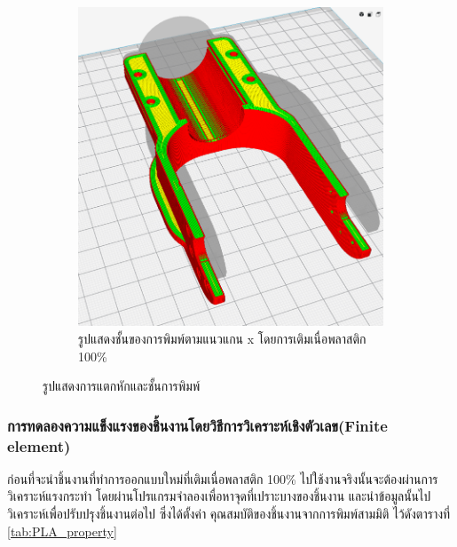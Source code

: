 \begin{figure}[!ht]
\begin{subfigure}[b]{0.38\linewidth}
        \includegraphics[width=\linewidth]{chapter4/images/fatigue3.png}
        \caption{รูปแสดงชั้นของการพิมพ์ตามแนวแกน x โดยการเติมเนื่อพลาสติก 100\%}
    \end{subfigure}
    \caption{รูปแสดงการแตกหักและชั้นการพิมพ์}
    \label{fig:fatiguelayer}
  \end{figure}

\subsubsection*{การทดลองความแข็งแรงของชิ้นงานโดยวิธีการวิเคราะห์เชิงตัวเลข(Finite element)}
ก่อนที่จะนำชิ้นงานที่ทำการออกแบบใหม่ที่เติมเนื่อพลาสติก 100\% ไปใช้งานจริงนั้นจะต้องผ่านการวิเคราะห์แรงกระทำ
โดยผ่านโปรแกรมจำลองเพื่อหาจุดที่เปราะบางของชิ้นงาน  และนำข้อมูลนั้นไปวิเคราะห์เพื่อปรับปรุงชิ้นงานต่อไป 
ซึ่งได้ตั้งค่า คุณสมบัติของชิ้นงานจากการพิมพ์สามมิติ ไว้ดังตารางที่ \ref{tab:PLA_property}

